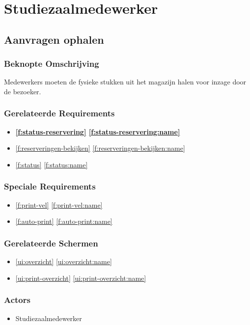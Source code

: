 \documentclass[a4paper,titlepage]{report}
\makeatletter
\def\namedlabel#1#2{
  \label{#1}
  \begingroup
   \def\@currentlabel{#2}%
   \label{#1:name}\endgroup
}
\def\namedref#1{\ref{#1} \ref{#1:name}}
\makeatother
\begin{document}
  \pagebreak
  \section{Studiezaalmedewerker}
    \subsection{Aanvragen ophalen}
    \namedlabel{u:aanvragen-ophalen}{Aanvragen ophalen}
      \subsubsection{Beknopte Omschrijving}
        Medewerkers moeten de fysieke stukken uit het magazijn halen voor
        inzage door de bezoeker.
      \subsubsection{Gerelateerde Requirements}
        \begin{itemize}
          \item \textbf{\namedref{f:status-reservering}}
          \item \namedref{f:reserveringen-bekijken}
          \item \namedref{f:status}
        \end{itemize}
      \subsubsection{Speciale Requirements}
      \begin{itemize}
        \item \namedref{f:print-vel}
        \item \namedref{f:auto-print}
      \end{itemize}
      \subsubsection{Gerelateerde Schermen}
        \begin{itemize}
          \item \namedref{ui:overzicht}
          \item \namedref{ui:print-overzicht}
        \end{itemize}
      \subsubsection{Actors}
        \begin{itemize}
          \item Studiezaalmedewerker
        \end{itemize}
\end{document}
